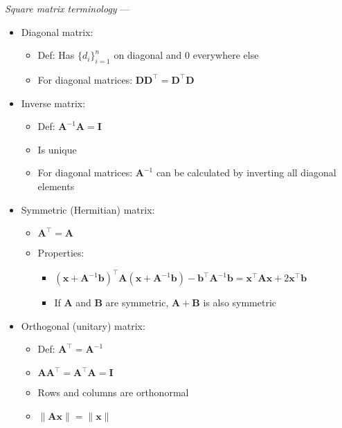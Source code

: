 \emph{Square matrix terminology} ---
\begin{itemize}
    \item Diagonal matrix:
    \begin{itemize}
        \item Def: Has $\{d_i\}_{i=1}^n$ on diagonal and 0 everywhere else
        \item For diagonal matrices: $\boldsymbol{D}\boldsymbol{D}^\intercal = \boldsymbol{D}^\intercal\boldsymbol{D}$
    \end{itemize} 
    \item Inverse matrix:
    \begin{itemize}
        \item Def: $\boldsymbol{A}^{-1}\boldsymbol{A} = \boldsymbol{I}$
        \item Is unique
        \item For diagonal matrices: $\boldsymbol{A}^{-1}$ can be calculated by inverting all diagonal elements  
    \end{itemize} 
    \item Symmetric (Hermitian) matrix:
    \begin{itemize}
        \item $\boldsymbol{A}^\intercal = \boldsymbol{A}$
        \item Properties:
        \begin{itemize}
            \item $( \boldsymbol{x} + \boldsymbol{A}^{-1} \boldsymbol{b} )^\intercal \boldsymbol{A} ( \boldsymbol{x} + \boldsymbol{A}^{-1} \boldsymbol{b} ) - \boldsymbol{b}^\intercal \boldsymbol{A}^{-1} \boldsymbol{b} = \boldsymbol{x}^\intercal \boldsymbol{A} \boldsymbol{x} + 2 \boldsymbol{x}^\intercal \boldsymbol{b}$
            \item If $\boldsymbol{A}$ and $\boldsymbol{B}$ are symmetric, $\boldsymbol{A} + \boldsymbol{B}$ is also symmetric
        \end{itemize}
    \end{itemize}
    \item Orthogonal (unitary) matrix: 
    \begin{itemize}
        \item Def: $\boldsymbol{A}^\intercal = \boldsymbol{A}^{-1}$
        \item $\boldsymbol{A}\boldsymbol{A}^\intercal = \boldsymbol{A}^\intercal\boldsymbol{A} = \boldsymbol{I}$
        \item Rows and columns are orthonormal
        \item $\|\boldsymbol{A} \boldsymbol{x}\| = \|\boldsymbol{x}\|$

\end{itemize}
\end{itemize}
